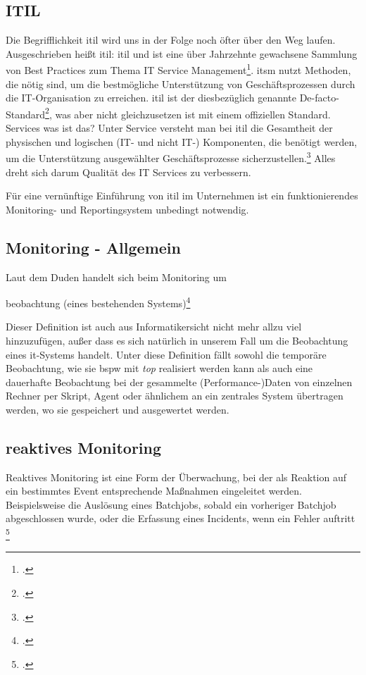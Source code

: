 \documentclass[12pt,a4paper,parskip,listof=totoc,bibliography=totoc]{scrreprt}
\begin{document}
	\subsection{ITIL}
	Die Begrifflichkeit \acrshort{itil} wird uns in der Folge noch öfter über den Weg laufen. Ausgeschrieben heißt \acrshort{itil}: \acrlong{itil} und ist eine über Jahrzehnte gewachsene Sammlung von Best Practices zum Thema IT Service Management\footcite{ebelitilv3}. \glqq\acrfull{itsm} nutzt Methoden, die nötig sind, um die bestmögliche Unterstützung von Geschäftsprozessen durch die IT-Organisation zu erreichen. \acrshort{itil} ist der diesbezüglich genannte De-facto-Standard\grqq\footcite[S. 27]{ebelitilv3}, was aber nicht gleichzusetzen ist mit einem offiziellen Standard. 
	Services was ist das? Unter Service versteht man bei \acrshort{itil} die Gesamtheit der physischen und logischen (IT- und nicht IT-) Komponenten, die benötigt werden, um die Unterstützung ausgewählter Geschäftsprozesse sicherzustellen.\footcite{sommeritservicemgmt}
	Alles dreht sich darum Qualität des IT Services zu verbessern. 
	
	Für eine vernünftige Einführung von \acrshort{itil} im Unternehmen ist ein funktionierendes Monitoring- und Reportingsystem unbedingt notwendig.
	\subsection{Monitoring - Allgemein}
	Laut dem Duden handelt sich beim Monitoring um
	\begin{center}
		\glqq[Dauer]beobachtung (eines bestehenden Systems)\grqq\footcite[S. 701; Stichwort Monitoring]{duden}
	\end{center}
	Dieser Definition ist auch aus Informatikersicht nicht mehr allzu viel hinzuzufügen, außer dass es sich natürlich in unserem Fall um die Beobachtung eines \acrshort{it}-Systems handelt. Unter diese Definition fällt sowohl die temporäre Beobachtung, wie sie \acrlong{bspw} mit \textit{top} realisiert werden kann als auch eine dauerhafte Beobachtung bei der gesammelte (Performance-)Daten von einzelnen Rechner per Skript, Agent oder ähnlichem an ein zentrales System übertragen werden, wo sie gespeichert und ausgewertet werden.
	
	\subsection{reaktives Monitoring}
	\glqq Reaktives Monitoring ist eine Form der Überwachung, bei der als Reaktion auf ein bestimmtes Event entsprechende Maßnahmen eingeleitet werden. Beispielsweise die Auslösung eines Batchjobs, sobald ein vorheriger Batchjob abgeschlossen wurde, oder die Erfassung eines Incidents, wenn ein Fehler auftritt\grqq
	\footcite[S. 511]{ebelitilv3}
	
\end{document}
